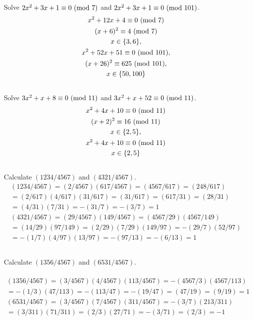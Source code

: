 \documentclass{article} \usepackage{amsmath}
\begin{document}
\subsection{}
Solve $2x^2 + 3x + 1 \equiv 0 \ (\mathrm{mod}\ 7)$ and $2x^2 + 3x + 1 \equiv 0 \ (\mathrm{mod}\ 101)$.
\begin{gather*}
    x^2 + 12x + 4 \equiv 0 \ (\mathrm{mod}\ 7)\\
    (x + 6)^2 \equiv 4 \ (\mathrm{mod}\ 7)\\
    x \in \{3, 6\},\\
    x^2 + 52x + 51 \equiv 0 \ (\mathrm{mod}\ 101),\\
    (x + 26)^2 \equiv 625 \ (\mathrm{mod}\ 101),\\
    x \in \{50, 100\}
\end{gather*}

\subsection{}
Solve $3x^2 + x + 8 \equiv 0 \ (\mathrm{mod}\ 11)$ and $3x^2 + x + 52 \equiv 0 \ (\mathrm{mod}\ 11)$.
\begin{gather*}
    x^2 + 4x + 10 \equiv 0 \ (\mathrm{mod}\ 11)\\
    (x + 2)^2 \equiv 16 \ (\mathrm{mod}\ 11)\\
    x \in \{2, 5\},\\
    x^2 + 4x + 10 \equiv 0 \ (\mathrm{mod}\ 11)\\
    x \in \{2, 5\}
\end{gather*}

\subsection{}
Calculate $(1234/4567)$ and $(4321/4567)$.
\begin{gather*}
    (1234/4567) = (2/4567)(617/4567) = (4567/617) = (248/617)\\
    = (2/617)(4/617)(31/617) = (31/617) = (617/31) = (28/31)\\
    = (4/31)(7/31) = -(31/7) = -(3/7) = 1\\
    (4321/4567) = (29/4567)(149/4567) = (4567/29)(4567/149)\\
    = (14/29)(97/149) = (2/29)(7/29)(149/97) = -(29/7)(52/97)\\
    = -(1/7)(4/97)(13/97) = -(97/13) = -(6/13) = 1
\end{gather*}

\subsection{}
Calculate $(1356/4567)$ and $(6531/4567)$.\\~\\
\begin{gather*}
    (1356/4567) = (3/4567)(4/4567)(113/4567) = -(4567/3)(4567/113)\\
    = -(1/3)(47/113) = -(113/47) = -(19/47) = (47/19) = (9/19) = 1\\
    (6531/4567) = (3/4567)(7/4567)(311/4567) = -(3/7)(213/311)\\
    = (3/311)(71/311) = (2/3)(27/71) = -(3/71) = (2/3) = -1
\end{gather*}
\end{document}
